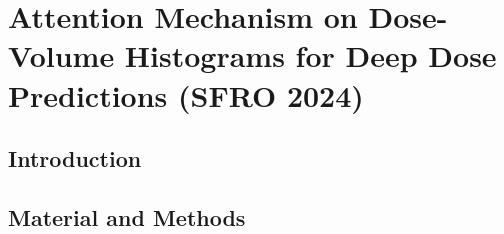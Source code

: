 

\section{Attention Mechanism on Dose-Volume Histograms for Deep Dose Predictions (SFRO 2024)}
\subsection{Introduction}

\subsection{Material and Methods}


